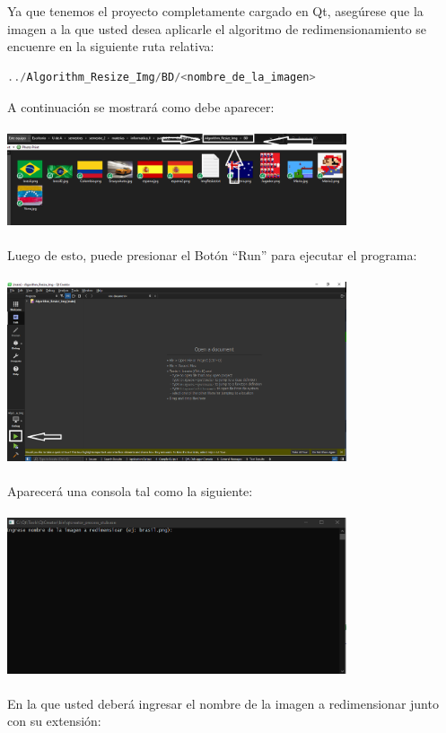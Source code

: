 \documentclass{article}
\begin{document}
\\
\\
Ya que tenemos el proyecto completamente cargado en Qt, asegúrese que la imagen a la que usted desea aplicarle el algoritmo de redimensionamiento se encuenre en la siguiente ruta relativa:
\begin{lstlisting}[language=C++, label=codigo_matrices_int]
../Algorithm_Resize_Img/BD/<nombre_de_la_imagen>
\end{lstlisting}
A continuación se mostrará como debe aparecer:
\\
\\
\includegraphics[width=10cm]{carpetaBD.PNG}
\\
\\
Luego de esto, puede presionar el Botón “Run” para ejecutar el programa:
\\
\\
\includegraphics[width=10cm]{run.PNG}
\\
\\
Aparecerá una consola tal como la siguiente:
\\
\\
\includegraphics[width=10cm]{consola.PNG}
\\
\\
En la que usted deberá ingresar el nombre de la imagen a redimensionar junto con su extensión:
\end{document}
